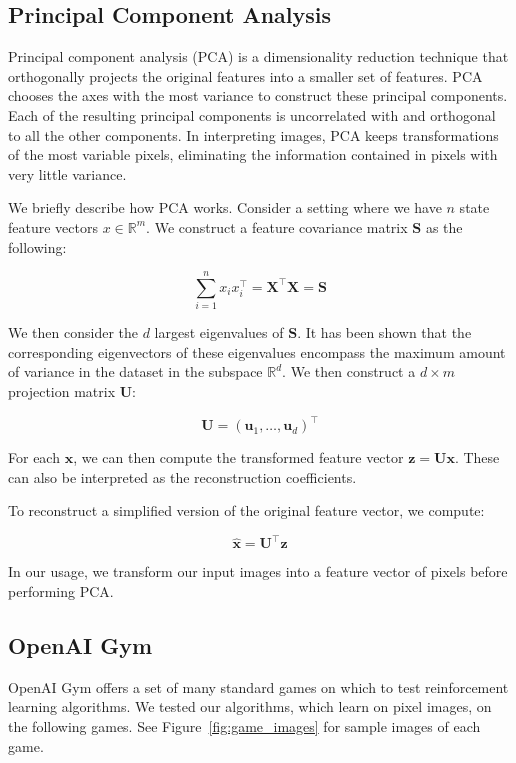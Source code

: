 \documentclass[11pt]{article}
\begin{document}
\subsection{Principal Component Analysis}

Principal component analysis (PCA) is a dimensionality reduction technique that orthogonally projects the original features into a smaller set of features. PCA chooses the axes with the most variance to construct these principal components. Each of the resulting principal components is uncorrelated with and orthogonal to all the other components. In interpreting images, PCA keeps transformations of the most variable pixels, eliminating the information contained in pixels with very little variance.

We briefly describe how PCA works. Consider a setting where we have $n$ state feature vectors $x \in \mathbb{R}^m$. We construct a feature covariance matrix $\mathbf{S}$ as the following:

$$\sum_{i=1}^n x_i x_i^\top = \mathbf{X}^\top \mathbf{X} = \mathbf{S}$$

We then consider the $d$ largest eigenvalues of $\mathbf{S}$. It has been shown that the corresponding eigenvectors of these eigenvalues encompass the maximum amount of variance in the dataset in the subspace $\mathbb{R}^d$. We then construct a $d \times m$ projection matrix $\mathbf{U}$:

$$\mathbf{U} = (\mathbf{u}_1, \ldots, \mathbf{u}_d)^\top$$

For each $\mathbf{x}$, we can then compute the transformed feature vector $\mathbf{z} = \mathbf{U}\mathbf{x}$. These can also be interpreted as the reconstruction coefficients.

To reconstruct a simplified version of the original feature vector, we compute:

$$\hat{\mathbf{x}} = \mathbf{U}^\top \mathbf{z}$$

In our usage, we transform our input images into a feature vector of pixels before performing PCA.


\subsection{OpenAI Gym}

OpenAI Gym \cite{brockman2016openai} offers a set of many standard games on which to test reinforcement learning algorithms. We tested our algorithms, which learn on pixel images, on the following games. See Figure~\ref{fig:game_images} for sample images of each game.
\end{document}
